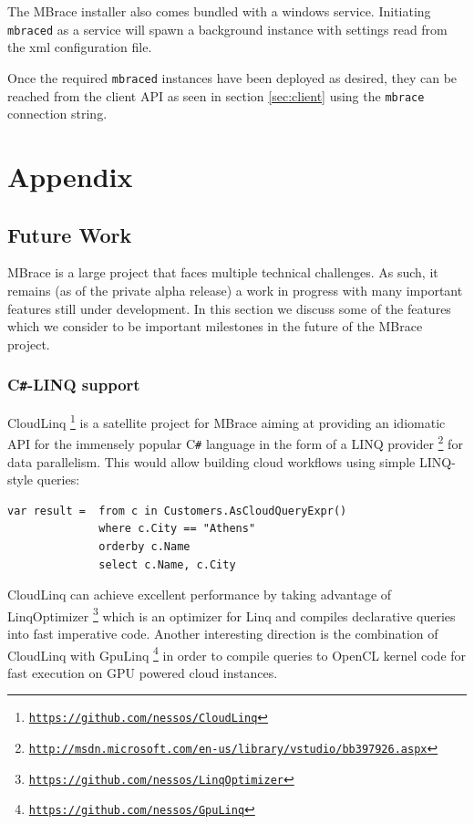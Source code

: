 \documentclass[9pt,a4paper]{article}
\newcommand{\mbrace}{MBrace}
\newcommand{\Mbrace}{MBrace}
\newcommand{\csharp}{C\texttt \#}
\newcommand{\samehref}[1]{\href{#1}{\texttt{#1}}}
\begin{document}
The \mbrace{} installer also comes bundled with a windows service.
Initiating \texttt{mbraced} as a service will spawn a background instance
with settings read from the xml configuration file.

Once the required \texttt{mbraced} instances have been deployed as desired,
they can be reached from the client API as seen in section \ref{sec:client}
using the \texttt{mbrace} connection string.

%
\appendix
%
%
%

\section*{Appendix}

\subsection*{Future Work}

\Mbrace{} is a large project that faces multiple technical challenges. As such,
it remains (as of the private alpha release) a work in progress with many important
features still under development. In this section we discuss some of the features
which we consider to be important milestones in the future of the \mbrace{} project.

\subsubsection*{\csharp{}-LINQ support}
CloudLinq%
\footnote{\samehref{https://github.com/nessos/CloudLinq}}
is a satellite project for \mbrace{} aiming at providing an idiomatic 
API for the immensely popular \csharp{} language in the
form of a LINQ provider%
\footnote{\samehref{http://msdn.microsoft.com/en-us/library/vstudio/bb397926.aspx}}
for data parallelism. This would allow building cloud workflows using simple
LINQ-style queries:
\begin{lstlisting}[language=CSharp]
var result =  from c in Customers.AsCloudQueryExpr()
			  where c.City == "Athens"
			  orderby c.Name
			  select c.Name, c.City
\end{lstlisting}
CloudLinq can achieve excellent performance by taking advantage of LinqOptimizer%
\footnote{\samehref{https://github.com/nessos/LinqOptimizer}}
which is an optimizer for Linq and compiles declarative queries into fast imperative code. Another interesting direction is the combination
of CloudLinq with GpuLinq%
\footnote{\samehref{https://github.com/nessos/GpuLinq}}
in order to compile queries to OpenCL kernel code for fast execution on GPU powered cloud instances.
\end{document}
